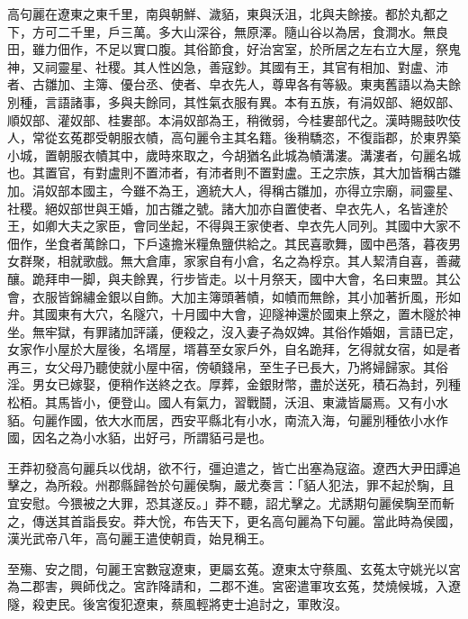 \begin{pinyinscope}
 
 
 高句麗在遼東之東千里，南與朝鮮、濊貊，東與沃沮，北與夫餘接。都於丸都之下，方可二千里，戶三萬。多大山深谷，無原澤。隨山谷以為居，食澗水。無良田，雖力佃作，不足以實口腹。其俗節食，好治宮室，於所居之左右立大屋，祭鬼神，又祠靈星、社稷。其人性凶急，善寇鈔。其國有王，其官有相加、對盧、沛者、古雛加、主簿、優台丞、使者、皁衣先人，尊卑各有等級。東夷舊語以為夫餘別種，言語諸事，多與夫餘同，其性氣衣服有異。本有五族，有涓奴部、絕奴部、順奴部、灌奴部、桂婁部。本涓奴部為王，稍微弱，今桂婁部代之。漢時賜鼓吹伎人，常從玄菟郡受朝服衣幘，高句麗令主其名籍。後稍驕恣，不復詣郡，於東界築小城，置朝服衣幘其中，歲時來取之，今胡猶名此城為幘溝漊。溝漊者，句麗名城也。其置官，有對盧則不置沛者，有沛者則不置對盧。王之宗族，其大加皆稱古雛加。涓奴部本國主，今雖不為王，適統大人，得稱古雛加，亦得立宗廟，祠靈星、社稷。絕奴部世與王婚，加古雛之號。諸大加亦自置使者、皁衣先人，名皆達於王，如卿大夫之家臣，會同坐起，不得與王家使者、皁衣先人同列。其國中大家不佃作，坐食者萬餘口，下戶遠擔米糧魚鹽供給之。其民喜歌舞，國中邑落，暮夜男女群聚，相就歌戲。無大倉庫，家家自有小倉，名之為桴京。其人絜清自喜，善藏釀。跪拜申一脚，與夫餘異，行步皆走。以十月祭天，國中大會，名曰東盟。其公會，衣服皆錦繡金銀以自飾。大加主簿頭著幘，如幘而無餘，其小加著折風，形如弁。其國東有大穴，名隧穴，十月國中大會，迎隧神還於國東上祭之，置木隧於神坐。無牢獄，有罪諸加評議，便殺之，沒入妻子為奴婢。其俗作婚姻，言語已定，女家作小屋於大屋後，名壻屋，壻暮至女家戶外，自名跪拜，乞得就女宿，如是者再三，女父母乃聽使就小屋中宿，傍頓錢帛，至生子已長大，乃將婦歸家。其俗淫。男女已嫁娶，便稍作送終之衣。厚葬，金銀財幣，盡於送死，積石為封，列種松栢。其馬皆小，便登山。國人有氣力，習戰鬪，沃沮、東濊皆屬焉。又有小水貊。句麗作國，依大水而居，西安平縣北有小水，南流入海，句麗別種依小水作國，因名之為小水貊，出好弓，所謂貊弓是也。
 
 
 
 
 王莽初發高句麗兵以伐胡，欲不行，彊迫遣之，皆亡出塞為寇盜。遼西大尹田譚追擊之，為所殺。州郡縣歸咎於句麗侯騊，嚴尤奏言：「貊人犯法，罪不起於騊，且宜安慰。今猥被之大罪，恐其遂反。」莽不聽，詔尤擊之。尤誘期句麗侯騊至而斬之，傳送其首詣長安。莽大恱，布告天下，更名高句麗為下句麗。當此時為侯國，漢光武帝八年，高句麗王遣使朝貢，始見稱王。
 
 
 
 
 至殤、安之間，句麗王宮數寇遼東，更屬玄菟。遼東太守蔡風、玄菟太守姚光以宮為二郡害，興師伐之。宮詐降請和，二郡不進。宮密遣軍攻玄菟，焚燒候城，入遼隧，殺吏民。後宮復犯遼東，蔡風輕將吏士追討之，軍敗沒。
 

\end{pinyinscope}

